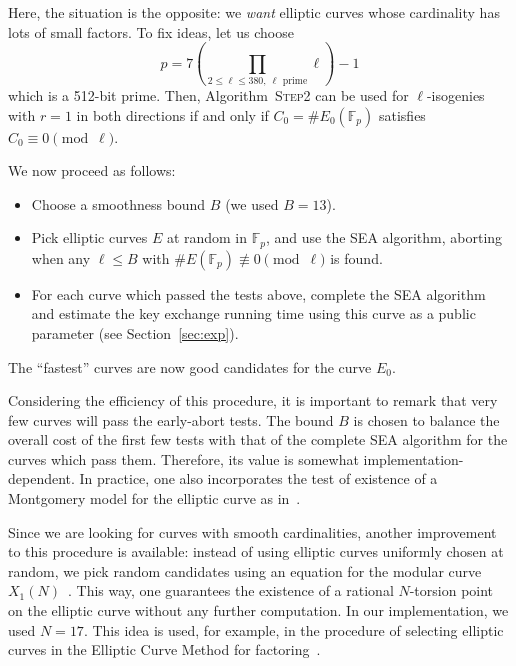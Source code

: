 \documentclass{article}
\newcommand{\F}{\mathbb{F}}
\newcommand{\algstyle}[1]{\textsc{#1}}
\theoremstyle{definition}
\begin{document}
Here, the situation is the opposite: we \emph{want} elliptic curves
whose cardinality has lots of small factors. To fix ideas, let us choose
\[
p = 7 \left(\prod_{2\leq\ell\leq 380,\ \ell \text{ prime}} \ell\right) - 1
\]
which is a 512-bit prime. Then, Algorithm~\algstyle{Step2} can be used
for $\ell$-isogenies with $r=1$ in both directions if and only if
$C_0 = \# E_0(\F_p)$ satisfies $C_0 \equiv0\pmod{\ell}$.

We now proceed as follows:
\begin{itemize}
\item Choose a smoothness bound $B$ (we used $B = 13$).
\item Pick elliptic curves $E$ at random in $\F_p$, and use the SEA algorithm,
aborting when any $\ell\leq B$ 
with $\#E(\F_p) \not\equiv 0\pmod{\ell}$ is found.
\item For each curve which passed the tests above, complete the SEA
algorithm and estimate the key exchange running time using this
curve as a public parameter (see Section~\ref{sec:exp}).
\end{itemize}
The ``fastest'' curves are now good candidates for the curve $E_0$.

Considering the efficiency of this procedure, it is important to remark
that very few curves will pass the early-abort tests. The bound $B$ is
chosen to balance the overall cost of the first few tests with that of
the complete SEA algorithm for the curves which pass them. Therefore,
its value is somewhat implementation-dependent. In practice, one also
incorporates the test of existence of a Montgomery model for the
elliptic curve as in~\cite{todo:refMontgomery}.

Since we are looking for curves with smooth cardinalities, another
improvement to this procedure is available: instead of using elliptic
curves uniformly chosen at random, we pick random candidates using
an equation for the modular curve $X_1(N)$~\cite{sutherland2012constructing}.
This way, one guarantees the existence of a rational $N$-torsion point
on the elliptic curve without any further computation. In our
implementation, we used $N = 17$. This idea is used, for example,
in the procedure of selecting elliptic curves in the Elliptic Curve Method
for factoring~\cite{todo:refECM}.
\end{document}
